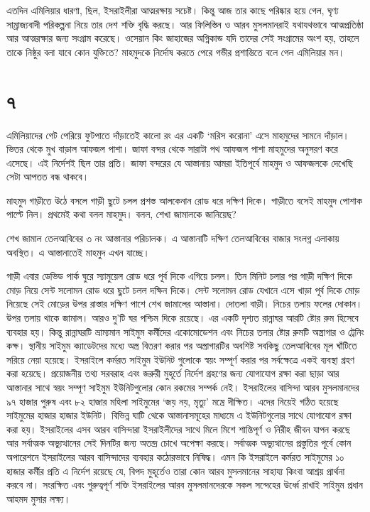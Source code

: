 \documentclass[
]{book}
\begin{document}
এতদিন এমিলিয়ার ধারণা, ছিল, ইসরাইলীরা আত্মরক্ষায় সচেষ্ট। কিন্তু আজ তার কাছে পরিষ্কার হয়ে গেল, ঘৃণ্য সাম্রাজ্যবাদী পরিকল্পনা নিয়ে তার দেশ শক্তি বৃদ্ধি করছে। আর ফিলিস্তিন ও আরব মুসলমানরাই যথাযথভাবে আত্মপ্রতিষ্ঠা আর আত্মরক্ষার জন্য সংগ্রাম করেছে। ওসেয়ান কিং জাহাজের অগ্নিকান্ড যদি তাদের সেই সংগ্রামের অংশ হয়, তাহলে তাকে নিষ্ঠুর বলা যাবে কোন যুক্তিতে? মাহমুদকে নির্দোষ করতে পেরে গভীর প্রশান্তিতে বলে গেল এমিলিয়ার মন।

\section*{৭}\label{ota-1-7}

এমিলিয়াদের গেট পেরিয়ে ফুটপাতে দাঁড়াতেই কালো রং এর একটি `মরিস করোনা' এসে মাহমুদের সামনে দাঁড়াল। ভিতর থেকে মুখ বাড়াল আফজল পাশা। জাফা বন্দর থেকে সারাটা পথ আফজল পাশা মাহমুদের অনুসরণ করে এসেছে। এই নির্দেশই ছিল তার প্রতি। জাফা বন্দরের যে আস্তানায় আমরা ইতিপূর্বে মাহমুদ ও আফজলকে দেখেছি সেটা আপতত বন্ধ থাকবে।

মাহমুদ গাড়ীতে উঠে বসলে গাড়ী ছুটে চলল প্রশস্ত আলকেনান রোড ধরে দক্ষিণ দিকে। গাড়ীতে বসেই মাহমুদ পোশাক পাল্টে নিল। প্রথমেই কথা বলল মাহমুদ। বলল, শেখা জামালকে জানিয়েছ?

শেখ জামাল তেলআবিবের ৩ নং আস্তানার পরিচালক। এ আস্তানাটি দক্ষিণ তেলআবিবের বাজার সংলগ্ন এলাকায় অবস্থিত। এ আস্তানাতেই মাহমুদ এখন যাচ্ছে।

গাড়ী এবার ডেভিড পার্ক ঘুরে স্যামুয়েল রোড ধরে পূর্ব দিকে এগিয়ে চলল। তিন মিনিট চলার পর গাড়ী দক্ষিণ দিকে মোড় নিয়ে সেন্ট সলোমন রোড ধরে ছুটে চলল দক্ষিন দিকে। সেন্ট সলোমন রোড যেখানে এসে খাড়া পূর্ব দিকে মোড় নিয়েছে সেই মোড়ের উপর রাস্তার দক্ষিণ পাশে শেখ জামালের আস্তানা। দোতলা বাড়ী। নিচের তলায় ফলের দোকান। উপর তলায় থাকে জামাল। আরও দু'টি ঘর পশ্চিম দিকে রয়েছে। এর একটি দৃশ্যত রান্নাঘর আরটি ষ্টোর রুম হিসেবে ব্যবহার হয়। কিন্তু রান্নাঘরটি ভ্রাম্যমান সাইমুম কর্মীদের একোমোডেশন এবং নিচের তলার ষ্টোর রুমটি অস্ত্রাগার ও ট্রেনিং কক্ষ। স্থানীয় সাইমুম ক্যাডেটদের মধ্যে অস্ত্র বিতরণ করার পর অস্ত্রাগারটির অবশিষ্ট সবকিছু তেলআবিবের মূল ঘাঁটিতে সরিয়ে নেয়া হয়েছে। ইসরাইলে কর্মরত সাইমুম ইউনিট গুলোকে স্বয়ং সম্পূর্ণ করার পর সর্বক্ষেত্রে একই ব্যবস্থা গ্রহণ করা হয়েছে। প্রয়োজনীয় তথ্য সরবরাহ এবং জরুরী মুহূর্তে নির্দেশ গ্রহণের জন্য যোগাযোগ রক্ষা করা ছাড়া আর আস্তানার সাথে স্বয়ং সম্পূণ সাইমুম ইউনিটগুলোর কোন রকমের সম্পর্ক নেই। ইসরাইলের বাসিন্দা আরব মুসলমানদের ৯৭ হাজার পুরুষ এবং ৮২ হাজার মহিলা সাইমুমের `জয় নয়, মৃত্যু' মন্ত্রে দীক্ষিত। এদের নিয়েই গঠিত হয়েছে সাইমুমের হাজার হাজার ইউনিট। বিভিন্ন ঘাটি থেকে আস্তানাসমূহের মাধ্যমে এ ইউনিটগুলোর সাথে যোগাযোগ রক্ষা করা হয়। ইসরাইলের এসব আরব বাসিন্দারা ইসরাইলীদের সাথে মিলে মিশে শান্তিপূর্ণ ও নিরীহ জীবন যাপন করছে আর সর্বাত্মক অভ্যুত্থানের সেই দিনটির জন্য অতন্দ্র চোখে অপেক্ষা করছে। সর্বাত্মক অভ্যুত্থানের প্রস্তুতির পূর্বে কোন অপারেশনে ইসরাইলের আরব বাসিন্দাদের ব্যবহার কঠোরভাবে নিষিদ্ধ। এমন কি ইসরাইলে কর্মরত সাইমুমের ১০ হাজার কর্মীর প্রতি এ নির্দেশ রয়েছে যে, বিপদ মুহূর্তেও তারা কোন আরব মুসলমানের সাহায্য কিংবা আশ্রয় প্রার্থনা করবে না। সংরক্ষিত এবং গুরুত্বপূর্ণ শক্তি ইসরাইলের আরব মুসলমানদেরকে সকল সন্দেহের উর্ধ্বে রাখাই সাইমুম প্রধান আহমদ মুসার লক্ষ্য।
\end{document}
